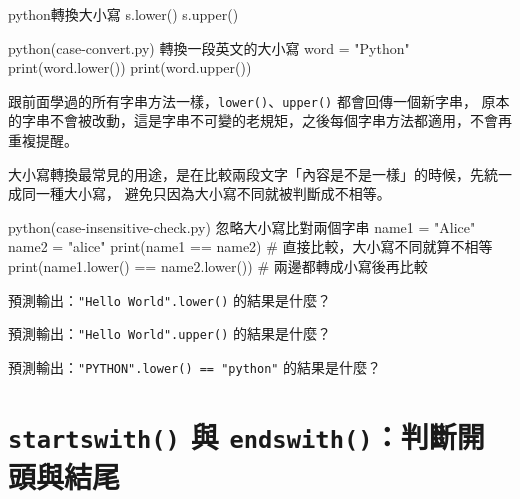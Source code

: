 \begin{code}{python}{轉換大小寫}
s.lower()
s.upper()
\end{code}

\begin{example}{python}{(case-convert.py) 轉換一段英文的大小寫}
word = "Python"
print(word.lower())
print(word.upper())
\end{example}


跟前面學過的所有字串方法一樣，\texttt{lower()}、\texttt{upper()} 都會回傳一個新字串，
原本的字串不會被改動，這是字串不可變的老規矩，之後每個字串方法都適用，不會再重複提醒。

大小寫轉換最常見的用途，是在比較兩段文字「內容是不是一樣」的時候，先統一成同一種大小寫，
避免只因為大小寫不同就被判斷成不相等。

\begin{example}{python}{(case-insensitive-check.py) 忽略大小寫比對兩個字串}
name1 = "Alice"
name2 = "alice"
print(name1 == name2)                  # 直接比較，大小寫不同就算不相等
print(name1.lower() == name2.lower())  # 兩邊都轉成小寫後再比較
\end{example}



\begin{drills}[label=drills:case-methods]
\item 預測輸出：\texttt{"Hello World".lower()} 的結果是什麼？
\item 預測輸出：\texttt{"Hello World".upper()} 的結果是什麼？
\item 預測輸出：\texttt{"PYTHON".lower() == "python"} 的結果是什麼？
\end{drills}

\section{\texttt{startswith()} 與 \texttt{endswith()}：判斷開頭與結尾}
\label{sec:startswith-endswith}

